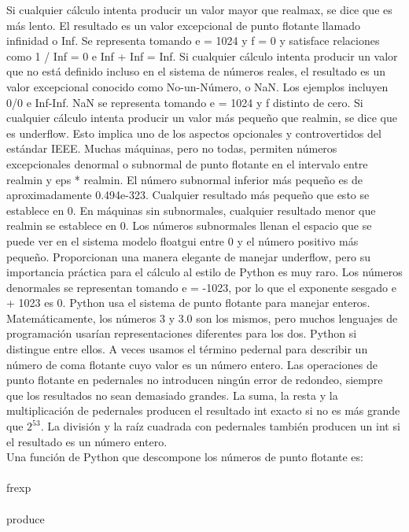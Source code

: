 \documentclass[12pt]{article}
\begin{document}
Si cualquier cálculo intenta producir un valor mayor que realmax, se dice que es más lento.
El resultado es un valor excepcional de punto flotante llamado infinidad o Inf. Se representa
tomando e = 1024 y f = 0 y satisface relaciones como 1 / Inf = 0 e Inf + Inf = Inf.
Si cualquier cálculo intenta producir un valor que no está definido incluso en el sistema de
números reales, el resultado es un valor excepcional conocido como No-un-Número, o NaN.
Los ejemplos incluyen 0/0 e Inf-Inf. NaN se representa tomando e = 1024 y f distinto de cero.
Si cualquier cálculo intenta producir un valor más pequeño que realmin, se dice que es
underflow. Esto implica uno de los aspectos opcionales y controvertidos del estándar IEEE.
Muchas máquinas, pero no todas, permiten números excepcionales denormal o subnormal
de punto flotante en el intervalo entre realmin y eps * realmin. El número subnormal inferior
más pequeño es de aproximadamente 0.494e-323. Cualquier resultado más pequeño que
esto se establece en 0. En máquinas sin subnormales, cualquier resultado menor que
realmin se establece en 0. Los números subnormales llenan el espacio que se puede ver en
el sistema modelo floatgui entre 0 y el número positivo más pequeño. Proporcionan una
manera elegante de manejar underflow, pero su importancia práctica para el cálculo al estilo
de Python es muy raro. Los números denormales se representan tomando e = -1023, por lo
que el exponente sesgado e + 1023 es 0.
Python usa el sistema de punto flotante para manejar enteros. Matemáticamente, los
números 3 y 3.0 son los mismos, pero muchos lenguajes de programación usarían
representaciones diferentes para los dos. Python si distingue entre ellos. A veces usamos el
término pedernal para describir un número de coma flotante cuyo valor es un número entero.
Las operaciones de punto flotante en pedernales no introducen ningún error de redondeo,
siempre que los resultados no sean demasiado grandes. La suma, la resta y la multiplicación
de pedernales producen el resultado int exacto si no es más grande que $2^{53}$. La división y la
raíz cuadrada con pedernales también producen un int si el resultado es un número entero.\\
Una funci\'on de Python que descompone los n\'umeros de punto flotante es:\\\\

frexp\\\\

produce\\\\
\end{document}
